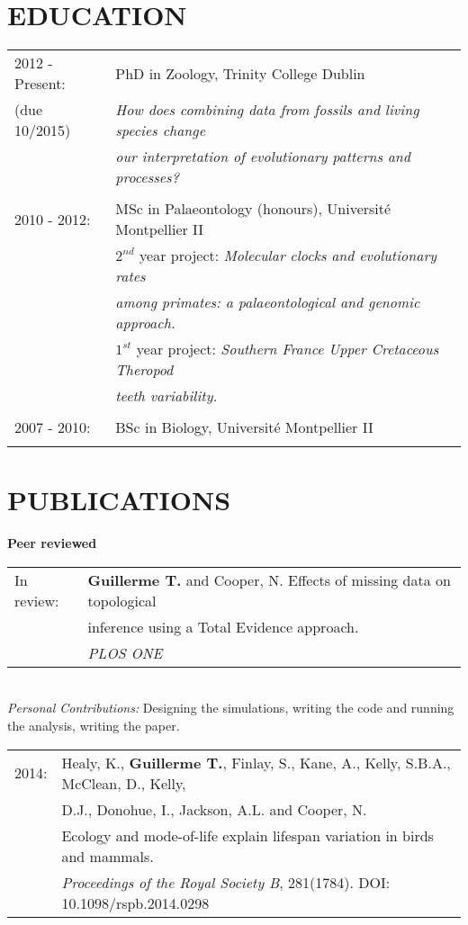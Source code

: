 \documentclass[10pt,a4paper]{article}
\begin{document}
{\section{EDUCATION}
\raggedright
\begin{tabular}{ll} 
2012 - Present: & PhD in Zoology, Trinity College Dublin\\
(due 10/2015) & \textit{How does combining data from fossils and living species change} \\
& \textit{our interpretation of evolutionary patterns and processes?}\\ &\\
2010 - 2012: & MSc in Palaeontology (honours), Universit\'{e} Montpellier II\\
& $2^{nd}$ year project: \textit{Molecular clocks and evolutionary rates}\\
& \textit{among primates: a palaeontological and genomic approach.} \\
& $1^{st}$ year project: \textit{Southern France Upper Cretaceous Theropod}\\
& \textit{teeth variability.} \\
& \\
2007 - 2010: & BSc in Biology, Universit\'{e} Montpellier II\\
& \\
\end{tabular}

\section{PUBLICATIONS}
\raggedright\textbf{Peer reviewed}\\[1.5ex]
\begin{tabular}{ll}
In review: & \textbf{Guillerme T.} and Cooper, N. Effects of missing data on topological\\
& inference using a Total Evidence approach.\\
& \textit{PLOS ONE}\\ %
\end{tabular}\\
\textit{Personal Contributions:} Designing the simulations, writing the code and running the analysis, writing the paper.
\bigskip

\begin{tabular}{ll}
2014: & Healy, K., \textbf{Guillerme T.}, Finlay, S., Kane, A., Kelly, S.B.A., McClean, D., Kelly, \\
& D.J., Donohue, I., Jackson, A.L. and Cooper, N. \\
& Ecology and mode-of-life explain lifespan variation in birds and mammals.\\
& \textit{Proceedings of the Royal Society B}, 281(1784). DOI: 10.1098/rspb.2014.0298\\ %
\end{tabular}

}
\end{document}
